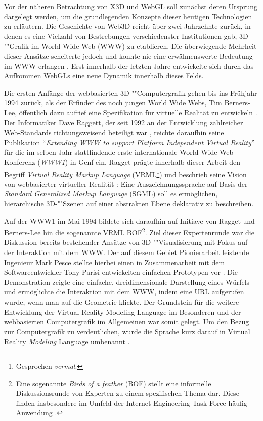 Vor der näheren Betrachtung von X3D und WebGL soll zunächst deren Ursprung dargelegt werden, um die grundlegenden Konzepte dieser heutigen Technologien zu erläutern. Die Geschichte von Web3D reicht über zwei Jahrzehnte zurück, in denen es eine Vielzahl von Bestrebungen verschiedenster Institutionen gab, 3D-""Grafik im World Wide Web (WWW) zu etablieren. Die überwiegende Mehrheit dieser Ansätze scheiterte jedoch und konnte nie eine erwähnenswerte Bedeutung im WWW erlangen \autocite{Evans201443}. Erst innerhalb der letzten Jahre entwickelte sich durch das Aufkommen WebGLs eine neue Dynamik innerhalb dieses Felds.

Die ersten Anfänge der webbasierten 3D-""Computergrafik gehen bis ins Frühjahr 1994 zurück, als der Erfinder des noch jungen World Wide Webs, Tim Berners-Lee, öffentlich dazu aufrief eine Spezifikation für virtuelle Realität zu entwickeln \autocite{Parisi:2012}. Der Informatiker Dave Raggett, der seit 1992 an der Entwicklung zahlreicher Web-Standards richtungsweisend beteiligt war \autocite{PEOPLE_OF_THE_W3C_RAGGETT}, reichte daraufhin seine Publikation \enquote{\emph{Extending WWW to support Platform Independent Virtual Reality}} für die im selben Jahr stattfindende erste internationale World Wide Web Konferenz (\emph{WWW1}) in Genf ein. Ragget prägte innerhalb dieser Arbeit den Begriff \emph{Virtual Reality Markup Language} (VRML\footnote{Gesprochen \emph{vermal}.}) und beschrieb seine Vision von webbasierter virtueller Realität  \autocite{VMRL_RAGGETT}: Eine Auszeichnungssprache auf Basis der \emph{Standard Generalized Markup Language} (SGML) soll es ermöglichen, hierarchische 3D-""Szenen auf einer abstrakten Ebene deklarativ zu beschreiben.

Auf der WWW1 im Mai 1994 bildete sich daraufhin auf Initiave von Ragget und Berners-Lee hin die sogenannte VRML BOF\footnote{Eine sogenannte \emph{Birds of a feather} (BOF) stellt eine informelle Diskussionsrunde von Experten zu einem spezifischen Thema dar. Diese finden insbesondere im Umfeld der Internet Engineering Task Force häufig Anwendung \autocite{RFC5434} \autocite{IETF_BOF_PROCEDURES}.}. Ziel dieser Expertenrunde war die Diskussion bereits bestehender Ansätze von 3D-""Visualisierung mit Fokus auf der Interaktion mit dem WWW. Der auf diesem Gebiet Pionierarbeit leistende Ingenieur Mark Pesce stellte hierbei einen in Zusammenarbeit mit dem Softwareentwickler Tony Parisi entwickelten einfachen Prototypen vor \autocite{Parisi:2012}. Die Demonstration zeigte eine einfache, dreidimensionale Darstellung eines Würfels und ermöglichte die Interaktion mit dem WWW, indem eine URL aufgerufen wurde, wenn man auf die Geometrie klickte. Der Grundstein für die weitere Entwicklung der Virtual Reality Modeling Language im Besonderen und der webbasierten Computergrafik im Allgemeinen war somit gelegt. Um den Bezug zur Computergrafik zu verdeutlichen, wurde die Sprache kurz darauf in Virtual Reality \emph{Modeling} Language umbenannt \autocite{VRML_10_SPECIFICATION}.

